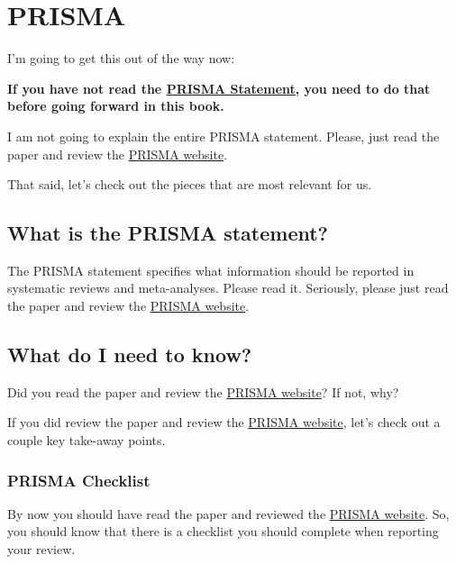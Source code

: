 \documentclass[
]{book}
\begin{document}
\hypertarget{PRISMA}{%
\chapter{PRISMA}\label{PRISMA}}

I'm going to get this out of the way now:

\textbf{If you have not read the \href{http://www.prisma-statement.org/}{PRISMA Statement}}\citep{page2021}\textbf{, you need to do that before going forward in this book.}

I am not going to explain the entire PRISMA statement. Please, just read the paper\citep{page2021} and review the \href{http://www.prisma-statement.org/}{PRISMA website}.

That said, let's check out the pieces that are most relevant for us.

\hypertarget{what-is-the-prisma-statement}{%
\section{What is the PRISMA statement?}\label{what-is-the-prisma-statement}}

The PRISMA statement specifies what information should be reported in systematic reviews and meta-analyses. Please read it. Seriously, please just read the paper\citep{page2021} and review the \href{http://www.prisma-statement.org/}{PRISMA website}.

\hypertarget{what-do-i-need-to-know}{%
\section{What do I need to know?}\label{what-do-i-need-to-know}}

Did you read the paper\citep{page2021} and review the \href{http://www.prisma-statement.org/}{PRISMA website}? If not, why?

If you did review the paper\citep{page2021} and review the \href{http://www.prisma-statement.org/}{PRISMA website}, let's check out a couple key take-away points.

\hypertarget{prisma-checklist}{%
\subsection{PRISMA Checklist}\label{prisma-checklist}}

By now you should have read the paper\citep{page2021} and reviewed the \href{http://www.prisma-statement.org/}{PRISMA website}. So, you should know that there is a checklist you should complete when reporting your review.
\end{document}
